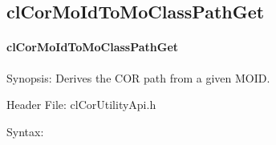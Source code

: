 \begin{flushleft}
\subsection{clCorMoIdToMoClassPathGet}
\hypertarget{pagecor126}{}\paragraph{cl\-Cor\-MoId\-To\-Mo\-Class\-Path\-Get}\label{pagecor126}
\begin{Desc}
\item[Synopsis:]Derives the COR path from a given MOID.\end{Desc}
\begin{Desc}
\item[Header File:]clCorUtilityApi.h\end{Desc}
\begin{Desc}
\item[Syntax:]


\end{Desc}
\end{flushleft}
